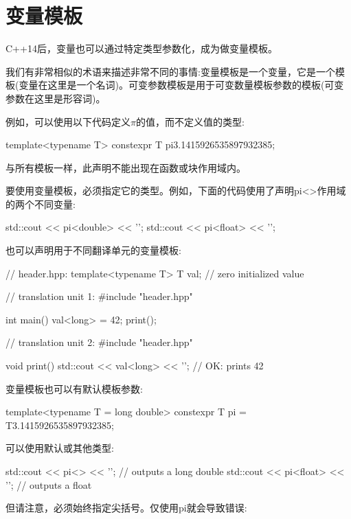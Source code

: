 \section{变量模板}
C++14后，变量也可以通过特定类型参数化，成为做变量模板。

\begin{notice}
我们有非常相似的术语来描述非常不同的事情:变量模板是一个变量，它是一个模板(变量在这里是一个名词)。可变参数模板是用于可变数量模板参数的模板(可变参数在这里是形容词)。
\end{notice}

例如，可以使用以下代码定义$\pi$的值，而不定义值的类型:

\begin{cpp}
template<typename T>
constexpr T pi{3.1415926535897932385};
\end{cpp}

与所有模板一样，此声明不能出现在函数或块作用域内。

要使用变量模板，必须指定它的类型。例如，下面的代码使用了声明pi<>作用域的两个不同变量:

\begin{cpp}
std::cout << pi<double> << '\n';
std::cout << pi<float> << '\n';
\end{cpp}

也可以声明用于不同翻译单元的变量模板:

\begin{cpp}
// header.hpp:
template<typename T> T val{}; // zero initialized value

// translation unit 1:
#include "header.hpp"

int main()
{
	val<long> = 42;
	print();
}

// translation unit 2:
#include "header.hpp"

void print()
{
	std::cout << val<long> << '\n'; // OK: prints 42
}
\end{cpp}

变量模板也可以有默认模板参数:

\begin{cpp}
template<typename T = long double>
constexpr T pi = T{3.1415926535897932385};
\end{cpp}

可以使用默认或其他类型:

\begin{cpp}
std::cout << pi<> << '\n'; // outputs a long double
std::cout << pi<float> << '\n'; // outputs a float
\end{cpp}

但请注意，必须始终指定尖括号。仅使用pi就会导致错误:

